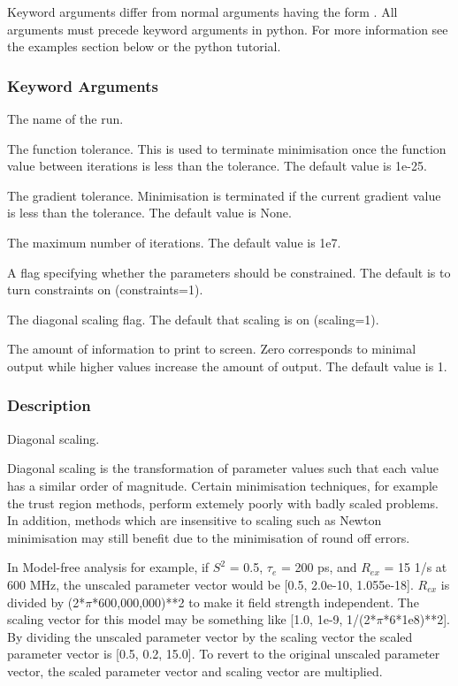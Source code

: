 Keyword arguments differ from normal arguments having the form 
.  All
arguments must precede keyword arguments in python.  For more information see the examples
section below or the python tutorial.


\subsubsection{Keyword Arguments}


  The name of the run.

  The function tolerance.  This is used to terminate minimisation once the function value between iterations is less than the tolerance.  The default value is 1e-25.

  The gradient tolerance.  Minimisation is terminated if the current gradient value is less than the tolerance.  The default value is None.

  The maximum number of iterations.  The default value is 1e7.

  A flag specifying whether the parameters should be constrained.  The default is to turn constraints on (constraints=1).

  The diagonal scaling flag.  The default that scaling is on (scaling=1).


  The amount of information to print to screen.  Zero corresponds to minimal output while higher values increase the amount of output.  The default value is 1.

\subsubsection{Description}

Diagonal scaling.

Diagonal scaling is the transformation of parameter values such that each value has a
similar order of magnitude.  Certain minimisation techniques, for example the trust region
methods, perform extemely poorly with badly scaled problems.  In addition, methods which are
insensitive to scaling such as Newton minimisation may still benefit due to the minimisation
of round off errors.

In Model-free analysis for example, if $S^2$ = 0.5, $\tau_e$ = 200 ps, and $R_{ex}$ = 15 1/s at 600 MHz,
the unscaled parameter vector would be [0.5, 2.0e-10, 1.055e-18].  $R_{ex}$ is divided by
(2*$\pi$*600,000,000)**2 to make it field strength independent.  The scaling vector for this
model may be something like [1.0, 1e-9, 1/(2*$\pi$*6*1e8)**2].  By dividing the unscaled
parameter vector by the scaling vector the scaled parameter vector is [0.5, 0.2, 15.0].  To
revert to the original unscaled parameter vector, the scaled parameter vector and scaling
vector are multiplied.


